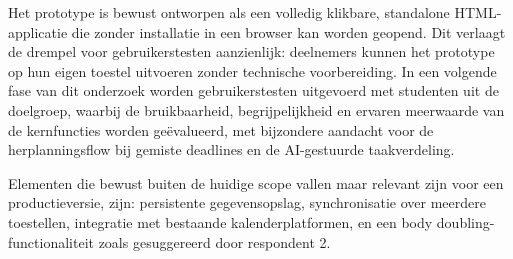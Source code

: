 Het prototype is bewust ontworpen als een volledig klikbare, standalone HTML-applicatie
die zonder installatie in een browser kan worden geopend. Dit verlaagt de drempel voor
gebruikerstesten aanzienlijk: deelnemers kunnen het prototype op hun eigen toestel
uitvoeren zonder technische voorbereiding. In een volgende fase van dit onderzoek worden
gebruikerstesten uitgevoerd met studenten uit de doelgroep, waarbij de bruikbaarheid,
begrijpelijkheid en ervaren meerwaarde van de kernfuncties worden geëvalueerd, met
bijzondere aandacht voor de herplanningsflow bij gemiste deadlines en de AI-gestuurde
taakverdeling.

Elementen die bewust buiten de huidige scope vallen maar relevant zijn voor een
productieversie, zijn: persistente gegevensopslag, synchronisatie over meerdere
toestellen, integratie met bestaande kalenderplatformen, en een body
doubling-functionaliteit zoals gesuggereerd door respondent 2.